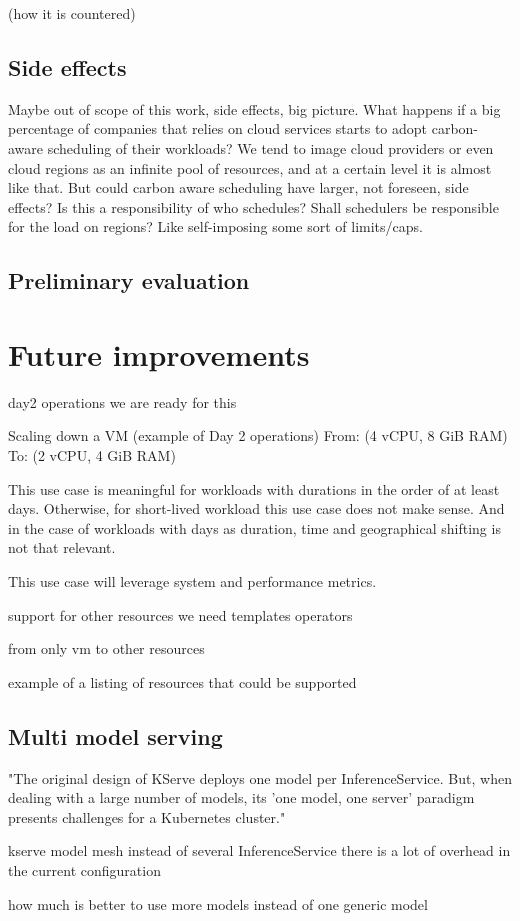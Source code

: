 (how it is countered)

\subsection{Side effects}

Maybe out of scope of this work, side effects, big picture.
What happens if a big percentage of companies that relies on cloud services starts to adopt carbon-aware scheduling of their workloads?
We tend to image cloud providers or even cloud regions as an infinite pool of resources, and at a certain level it is almost like that. But could carbon aware scheduling have larger, not foreseen, side effects?
Is this a responsibility of who schedules? Shall schedulers be responsible for the load on regions? Like self-imposing some sort of limits/caps.

\subsection{Preliminary evaluation}

\section{Future improvements}

day2 operations
we are ready for this

Scaling down a VM (example of Day 2 operations)
From: (4 vCPU, 8 GiB RAM)
To: (2 vCPU, 4 GiB RAM)

This use case is meaningful for workloads with durations in the order of at least days. Otherwise, for short-lived workload this use case does not make sense.
And in the case of workloads with days as duration, time and geographical shifting is not that relevant.

This use case will leverage system and performance metrics.



support for other resources
we need
templates
operators

from only vm 
to other resources

example of a listing of resources that could be supported


\subsection{Multi model serving}

"The original design of KServe deploys one model per InferenceService. But, when dealing with a large number of models, its 'one model, one server' paradigm presents challenges for a Kubernetes cluster."

kserve model mesh instead of several InferenceService
there is a lot of overhead in the current configuration

how much is better to use more models instead of one generic model 




\newpage

